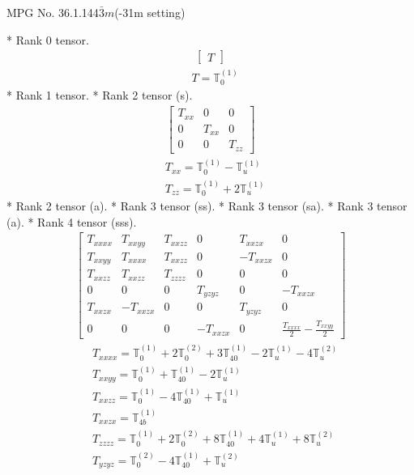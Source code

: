 \documentclass[fleqn,8pt,landscape]{jsarticle}
\begin{document}
\setcounter{MaxMatrixCols}{32}

\renewcommand{\tablename}{Table~}
\renewcommand{\figurename}{Figure~}
\begin{center}
\LARGE
MPG No. 36.1.144\quad$\bar{3}m$\quad(-31m setting)
\end{center}
* Rank 0 tensor.
\begin{align*}
\begin{bmatrix} T \end{bmatrix}
\end{align*}
\begin{align*}
& T = \mathbb{T}_{0}^{(1)}
\end{align*}
* Rank 1 tensor.
* Rank 2 tensor (s).
\begin{align*}
\begin{bmatrix} T_{xx} & 0 & 0 \\ 0 & T_{xx} & 0 \\ 0 & 0 & T_{zz} \end{bmatrix}
\end{align*}
\begin{align*}
& T_{xx} = \mathbb{T}_{0}^{(1)} - \mathbb{T}_{u}^{(1)} \\
& T_{zz} = \mathbb{T}_{0}^{(1)} + 2 \mathbb{T}_{u}^{(1)}
\end{align*}
* Rank 2 tensor (a).
* Rank 3 tensor (ss).
* Rank 3 tensor (sa).
* Rank 3 tensor (a).
* Rank 4 tensor (sss).
\begin{align*}
\begin{bmatrix} T_{xxxx} & T_{xxyy} & T_{xxzz} & 0 & T_{xxzx} & 0 \\ T_{xxyy} & T_{xxxx} & T_{xxzz} & 0 & - T_{xxzx} & 0 \\ T_{xxzz} & T_{xxzz} & T_{zzzz} & 0 & 0 & 0 \\ 0 & 0 & 0 & T_{yzyz} & 0 & - T_{xxzx} \\ T_{xxzx} & - T_{xxzx} & 0 & 0 & T_{yzyz} & 0 \\ 0 & 0 & 0 & - T_{xxzx} & 0 & \frac{T_{xxxx}}{2} - \frac{T_{xxyy}}{2} \end{bmatrix}
\end{align*}
\begin{align*}
& T_{xxxx} = \mathbb{T}_{0}^{(1)} + 2 \mathbb{T}_{0}^{(2)} + 3 \mathbb{T}_{40}^{(1)} - 2 \mathbb{T}_{u}^{(1)} - 4 \mathbb{T}_{u}^{(2)} \\
& T_{xxyy} = \mathbb{T}_{0}^{(1)} + \mathbb{T}_{40}^{(1)} - 2 \mathbb{T}_{u}^{(1)} \\
& T_{xxzz} = \mathbb{T}_{0}^{(1)} - 4 \mathbb{T}_{40}^{(1)} + \mathbb{T}_{u}^{(1)} \\
& T_{xxzx} = \mathbb{T}_{4b}^{(1)} \\
& T_{zzzz} = \mathbb{T}_{0}^{(1)} + 2 \mathbb{T}_{0}^{(2)} + 8 \mathbb{T}_{40}^{(1)} + 4 \mathbb{T}_{u}^{(1)} + 8 \mathbb{T}_{u}^{(2)} \\
& T_{yzyz} = \mathbb{T}_{0}^{(2)} - 4 \mathbb{T}_{40}^{(1)} + \mathbb{T}_{u}^{(2)}
\end{align*}
\end{document}
